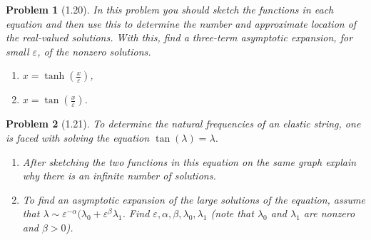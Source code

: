 \documentclass[11pt]{article}
\newcommand{\vep}{\varepsilon}
\theoremstyle{problemstyle}
\newtheorem{problem}{Problem}
\begin{document}
\newpage
\begin{problem}[1.20]
  In this problem you should sketch the functions in each equation and then use this to determine
  the number and approximate location of the real-valued solutions. With this, find a three-term
  asymptotic expansion, for small $\vep$, of the nonzero solutions.
  \begin{enumerate}
    \item $x = \tanh \left(\frac{x}{\vep}\right)$,
    \item $x = \tan\left(\frac{x}{\vep}\right)$.
  \end{enumerate}
\end{problem}

\newpage
\begin{problem}[1.21]
  To determine the natural frequencies of an elastic string, one is faced with solving the equation
  $\tan(\lambda) = \lambda$.
  \begin{enumerate}
    \item After sketching the two functions in this equation on the same graph explain why there is
      an infinite number of solutions.
    \item To find an asymptotic expansion of the large solutions of the equation, assume that
      $\lambda \sim \vep^{-\alpha}(\lambda_0 + \vep^\beta\lambda_1$. Find
      $\vep, \alpha, \beta, \lambda_0, \lambda_1$ (note that $\lambda_0$ and $\lambda_1$ are
      nonzero and $\beta > 0$).
  \end{enumerate}
\end{problem}
\end{document}
